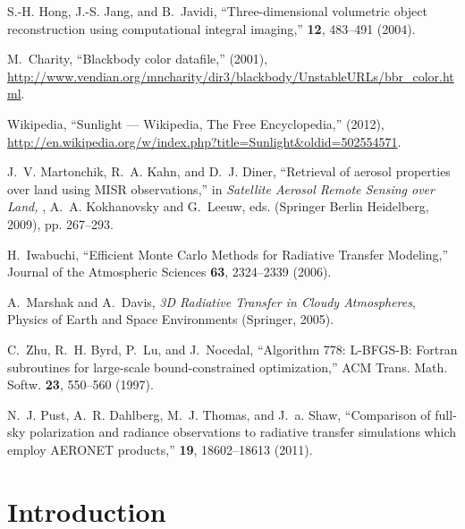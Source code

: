 \documentclass[10pt,letterpaper]{article}
\begin{document}
\begin{thebibliography}{10}
S.-H. Hong, J.-S. Jang, and B.~Javidi, \enquote{{Three-dimensional volumetric
  object reconstruction using computational integral imaging},} \opex
  \textbf{12}, 483--491 (2004).

M.~Charity, \enquote{{Blackbody color datafile},}  (2001), \url{http://www.vendian.org/mncharity/dir3/blackbody/UnstableURLs/bbr\_color.html}.

Wikipedia, \enquote{{Sunlight --- {W}ikipedia{,} The Free Encyclopedia},}
  (2012), \url{http://en.wikipedia.org/w/index.php?title=Sunlight\&oldid=502554571}.

J.~V. Martonchik, R.~A. Kahn, and D.~J. Diner, \enquote{{Retrieval of aerosol
  properties over land using MISR observations},} in \emph{Satellite Aerosol
  Remote Sensing over Land,} , A.~A. Kokhanovsky and G.~Leeuw, eds. (Springer
  Berlin Heidelberg, 2009), pp. 267--293.

H.~Iwabuchi, \enquote{{Efficient Monte Carlo Methods for Radiative Transfer
  Modeling},} Journal of the Atmospheric Sciences \textbf{63}, 2324--2339
  (2006).

A.~Marshak and A.~Davis, \emph{{3D Radiative Transfer in Cloudy Atmospheres}},
  Physics of Earth and Space Environments (Springer, 2005).

C.~Zhu, R.~H. Byrd, P.~Lu, and J.~Nocedal, \enquote{{Algorithm 778: L-BFGS-B:
  Fortran subroutines for large-scale bound-constrained optimization},} ACM
  Trans. Math. Softw. \textbf{23}, 550--560 (1997).

N.~J. Pust, A.~R. Dahlberg, M.~J. Thomas, and J.~a. Shaw, \enquote{{Comparison
  of full-sky polarization and radiance observations to radiative transfer
  simulations which employ AERONET products},} \opex \textbf{19},
  18602--18613 (2011).

\end{thebibliography}


\section{Introduction}
\label{sec:intro}
\end{document}
